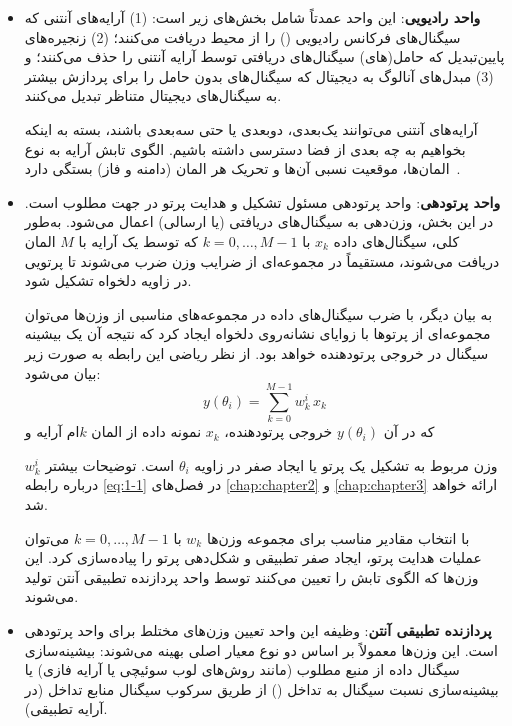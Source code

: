 \begin{itemize}
	
	\item \textbf{واحد رادیویی}:  
	این واحد عمدتاً شامل بخش‌های زیر است:  
	(1) آرایه‌های آنتنی که سیگنال‌های فرکانس رادیویی () را از محیط دریافت می‌کنند؛  
	(2) زنجیره‌های پایین‌تبدیل که حامل(های) سیگنال‌های  دریافتی توسط آرایه آنتنی را حذف می‌کنند؛  
	و (3) مبدل‌های آنالوگ به دیجیتال که سیگنال‌های بدون حامل را برای پردازش بیشتر به سیگنال‌های دیجیتال متناظر تبدیل می‌کنند.  
	
	آرایه‌های آنتنی می‌توانند یک‌بعدی، دوبعدی یا حتی سه‌بعدی باشند، بسته به اینکه بخواهیم به چه بعدی از فضا دسترسی داشته باشیم. الگوی تابش آرایه به نوع المان‌ها، موقعیت نسبی آن‌ها و تحریک هر المان (دامنه و فاز) بستگی دارد~\cite{5}.
	
	\item \textbf{واحد پرتودهی}:  
	واحد پرتودهی مسئول تشکیل و هدایت پرتو در جهت مطلوب است. در این بخش، وزن‌دهی به سیگنال‌های دریافتی (یا ارسالی) اعمال می‌شود. به‌طور کلی، سیگنال‌های داده $x_k$ با $k=0,\ldots,M-1$ که توسط یک آرایه با $M$ المان دریافت می‌شوند، مستقیماً در مجموعه‌ای از ضرایب وزن ضرب می‌شوند تا پرتویی در زاویه دلخواه تشکیل شود.  
	
	به بیان دیگر، با ضرب سیگنال‌های داده در مجموعه‌های مناسبی از وزن‌ها می‌توان مجموعه‌ای از پرتوها با زوایای نشانه‌روی دلخواه ایجاد کرد که نتیجه آن یک بیشینه سیگنال در خروجی پرتودهنده خواهد بود. از نظر ریاضی این رابطه به صورت زیر بیان می‌شود:
	\begin{equation}
		y(\theta_i) = \sum_{k=0}^{M-1} w_{k}^i \, x_k
		\label{eq:1-1}
	\end{equation}
	که در آن $y(\theta_i)$ خروجی پرتودهنده، $x_k$ نمونه داده از المان $k$ام آرایه و 
	
	$w_{k}^i$ وزن مربوط به تشکیل یک پرتو یا ایجاد صفر در زاویه $\theta_i$ است. توضیحات بیشتر درباره رابطه \eqref{eq:1-1} در فصل‌های \ref{chap:chapter2} و \ref{chap:chapter3} ارائه خواهد شد.
	
	با انتخاب مقادیر مناسب برای مجموعه وزن‌ها $w_k$ با $k=0,\ldots,M-1$ می‌توان عملیات هدایت پرتو، ایجاد صفر تطبیقی و شکل‌دهی پرتو را پیاده‌سازی کرد. این وزن‌ها که الگوی تابش را تعیین می‌کنند توسط واحد پردازنده تطبیقی آنتن تولید می‌شوند.
	
	\item \textbf{پردازنده تطبیقی آنتن}:  
	وظیفه این واحد تعیین وزن‌های مختلط برای واحد پرتودهی است. این وزن‌ها معمولاً بر اساس دو نوع معیار اصلی بهینه می‌شوند: بیشینه‌سازی سیگنال داده از منبع مطلوب (مانند روش‌های لوب سوئیچی یا آرایه فازی) یا بیشینه‌سازی نسبت سیگنال به تداخل () از طریق سرکوب سیگنال منابع تداخل (در آرایه تطبیقی).
	

\end{itemize}
